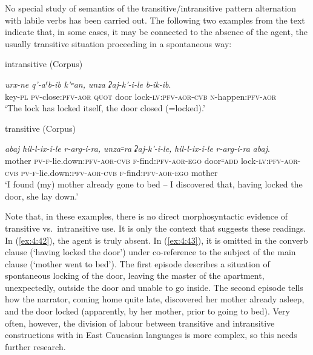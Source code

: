 \documentclass[output=paper]{langsci/langscibook}
\begin{document}
No special study of semantics of the transitive/intransitive pattern
alternation with labile verbs has been carried out. The following two
examples from the text indicate that, in some cases, it may be connected
to the absence of the agent, the usually transitive situation proceeding
in a spontaneous way:


\ea \label{ex:4:42} %
intransitive (Corpus)

\gll \emph{urx-ne} \emph{q'-aˤb-ib} \emph{k'ʷan,} \emph{unza} \emph{ʡaj-k'-i-le} \emph{b-ik-ib}.\\
key-\textsc{pl} \textsc{pv}-close:\textsc{pfv}-\textsc{aor} \textsc{quot} door lock-\textsc{lv}:\textsc{pfv}-\textsc{aor}-\textsc{cvb} \textsc{n}-happen:\textsc{pfv}-\textsc{aor}\\
\glt `The lock has locked itself, the door closed (=locked).'

\ex \label{ex:4:43} %
transitive (Corpus)

\gll \emph{abaj} \emph{hil-l-ix-i-le} \emph{r-arg-i-ra,} \emph{unza꞊ra} \emph{ʡaj-k'-i-le,} \emph{hil-l-ix-i-le} \emph{r-arg-i-ra} \emph{abaj}.\\
mother \textsc{pv}-\textsc{f}-lie.down:\textsc{pfv}-\textsc{aor}-\textsc{cvb} \textsc{f}-find:\textsc{pfv}-\textsc{aor}-\textsc{ego} door꞊\textsc{add} lock-\textsc{lv}:\textsc{pfv}-\textsc{aor}-\textsc{cvb} \textsc{pv}-\textsc{f}-lie.down:\textsc{pfv}-\textsc{aor}-\textsc{cvb} \textsc{f}-find:\textsc{pfv}-\textsc{aor}-\textsc{ego} mother\\
\glt 
`I found (my) mother already gone to bed – I discovered that, having
locked the door, she lay down.' \pagebreak[4]
\z


Note that, in these examples, there is no direct morphosyntactic
evidence of transitive vs.\ intransitive use. It is only the context that
suggests these readings.
%
In (\ref{ex:4:42}), the agent is truly absent. In (\ref{ex:4:43}), it is omitted in the converb clause (`having locked the door') under co-reference to the subject of the main clause (`mother went to bed').
%
The first episode describes a situation of
spontaneous locking of the door, leaving the master of the apartment,
unexpectedly, outside the door and unable to go inside. The second
episode tells how the narrator, coming home quite late, discovered her
mother already asleep, and the door locked (apparently, by her mother,
prior to going to bed). Very often, however, the division of labour between
transitive and intransitive constructions with  in East
Caucasian languages is more complex, so this needs further research.
\end{document}
